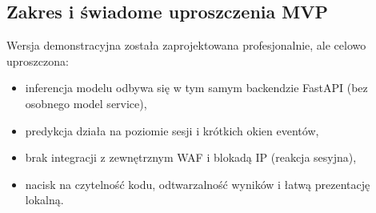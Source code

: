 \subsection{Zakres i świadome uproszczenia MVP}
Wersja demonstracyjna została zaprojektowana profesjonalnie, ale celowo uproszczona:
\begin{itemize}
  \item inferencja modelu odbywa się w tym samym backendzie FastAPI (bez osobnego model service),
  \item predykcja działa na poziomie sesji i krótkich okien eventów,
  \item brak integracji z zewnętrznym WAF i blokadą IP (reakcja sesyjna),
  \item nacisk na czytelność kodu, odtwarzalność wyników i łatwą prezentację lokalną.
\end{itemize}
